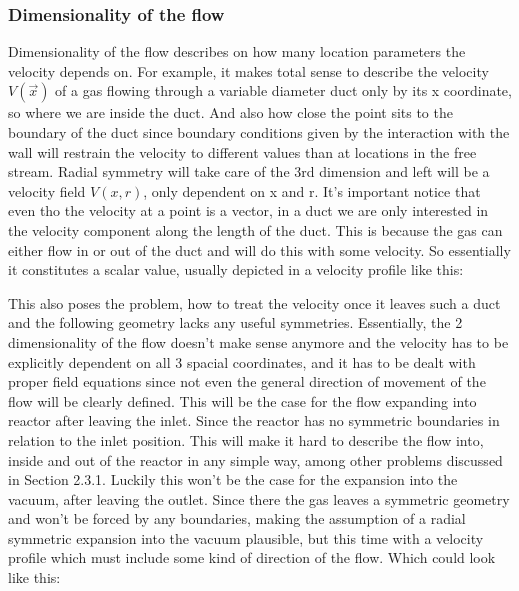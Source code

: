 \newpage

\subsubsection{Dimensionality of the flow}

	Dimensionality of the flow describes on how many location parameters the velocity depends on. For example, it makes total sense to describe the velocity $V(\vec{x})$ of a gas flowing through a variable diameter duct only by its x coordinate, so where we are inside the duct. And also how close the point sits to the boundary of the duct since boundary conditions given by the interaction with the wall will restrain the velocity to different values than at locations in the free stream. Radial symmetry will take care of the 3rd dimension and left will be a velocity field $V(x,r)$, only dependent on x and r. It's important notice that even tho the velocity at a point is a vector, in a duct we are only interested in the velocity component along the length of the duct. This is because the gas can either flow in or out of the duct and will do this with some velocity. So essentially it constitutes  a scalar value, usually depicted in a velocity profile like this:\\


	This also poses the problem, how to treat the velocity once it leaves such a duct and the following geometry lacks any useful symmetries. Essentially, the 2 dimensionality of the flow doesn't make sense anymore and the velocity has to be explicitly dependent on all 3 spacial coordinates, and it has to be dealt with proper field equations since not even the general direction of movement of the flow will be clearly defined. This will be the case for the flow expanding into reactor after leaving the inlet. Since the reactor has no symmetric boundaries in relation to the inlet position. This will make it hard to describe the flow into, inside and out of the reactor in any simple way, among other problems discussed in Section 2.3.1. Luckily this won't be the case for the expansion into the vacuum, after leaving the outlet. Since there the gas leaves a symmetric geometry and won't be forced by any boundaries, making the assumption of a radial symmetric expansion into the vacuum plausible, but this time with a velocity profile which must include some kind of direction of the flow. Which could look like this:\\

